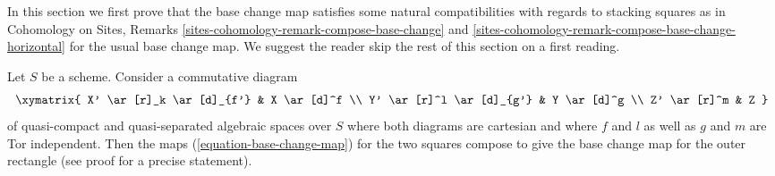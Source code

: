 \medskip\noindent
In this section we first prove that the base change map satisfies
some natural compatibilities with regards to stacking squares as in
Cohomology on Sites, Remarks \ref{sites-cohomology-remark-compose-base-change}
and
\ref{sites-cohomology-remark-compose-base-change-horizontal} for the usual
base change map. We suggest the reader skip the rest of this section
on a first reading.

\begin{lemma}
\label{lemma-compose-base-change-maps}
Let $S$ be a scheme. Consider a commutative diagram
$$
\xymatrix{
X' \ar[r]_k \ar[d]_{f'} & X \ar[d]^f \\
Y' \ar[r]^l \ar[d]_{g'} & Y \ar[d]^g \\
Z' \ar[r]^m & Z
}
$$
of quasi-compact and quasi-separated algebraic spaces over $S$ where
both diagrams are cartesian and where $f$ and $l$
as well as $g$ and $m$ are Tor independent.
Then the maps (\ref{equation-base-change-map})
for the two squares compose to give the base
change map for the outer rectangle (see proof for a precise statement).
\end{lemma}

